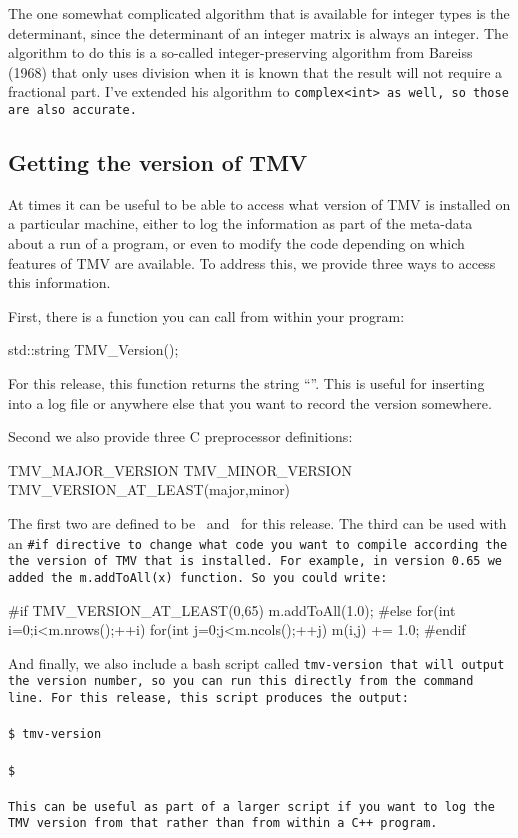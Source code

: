The one somewhat complicated algorithm that is available for integer types is
the determinant, since the determinant of an integer matrix is always an integer.
The algorithm to do this is a so-called integer-preserving algorithm from Bareiss (1968)
that only uses division when it is known that the result will not require a fractional part.
I've extended his algorithm to \tt{complex<int>} as well, so those are also accurate.

\subsection{Getting the version of TMV}

At times it can be useful to be able to access what version of TMV is installed on a 
particular machine, either to log the information as part of the meta-data about a
run of a program, or even to modify the code depending on which features of TMV
are available.  To address this, we provide three ways to access this information.

First, there is a function you can call from within your program:
\begin{tmvcode}
std::string TMV_Version();
\end{tmvcode}
For this release, this function returns the string ``\tttmvversion''.  This is useful for inserting
into a log file or anywhere else that you want to record the version somewhere.

Second we also provide three C preprocessor definitions:
\begin{tmvcode}
TMV_MAJOR_VERSION
TMV_MINOR_VERSION
TMV_VERSION_AT_LEAST(major,minor)
\end{tmvcode}
The first two are defined to be \tmvmajorversion\ and \tmvminorversion\ for this release.
The third can be used with an \tt{#if} directive to change what code you want to compile
according the the version of TMV that is installed.
For example, in version 0.65 we added the \tt{m.addToAll(x)} function.  So you could
write:
\begin{tmvcode}
#if TMV_VERSION_AT_LEAST(0,65)
m.addToAll(1.0);
#else
for(int i=0;i<m.nrows();++i) 
    for(int j=0;j<m.ncols();++j)
        m(i,j) += 1.0;
#endif
\end{tmvcode}

And finally, we also include a bash script called \tt{tmv-version} that will output
the version number, so you can run this
directly from the command line.  For this release, this script produces the output:\\ \\
\texttt{\$ tmv-version} \\
\tttmvversion \\
\texttt{\$}\\ \\
This can be useful as part of a larger script if you want to log the TMV version from that
rather than from within a C++ program.  

